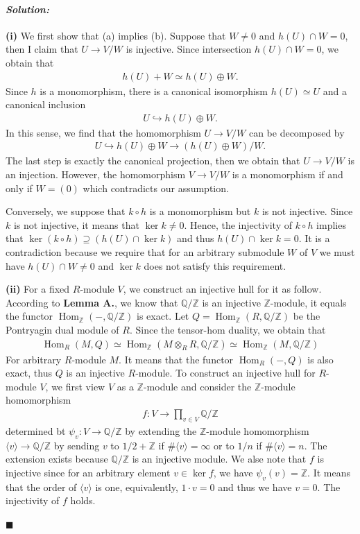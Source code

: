 \documentclass[12pt, a4paper]{article}
\newcommand{\qz}{\mathbb{Q}/\mathbb{Z}}
\newcommand{\z}{\mathbb{Z}}
\renewcommand{\hom}{\operatorname{Hom}}
\theoremstyle{remark}
\newenvironment{solution}
  {\paragraph{\textit{Solution:}}\par\medskip}
  {\hfill$\blacksquare$\vspace{0.1cm}}
\begin{document}
\begin{solution}
    \textbf{(i)}
    We first show that (a) implies (b). Suppose that $W\neq 0$ and $h(U)\cap W = 0$, then I claim that $U\to V/W$ is injective.
    Since intersection $h(U)\cap W = 0$, we obtain that
    \begin{align*}
        h(U)+W\simeq h(U)\oplus W.
    \end{align*}
    Since $h$ is a monomorphism, there is a canonical isomorphism $h(U)\simeq U$ and a canonical inclusion
    \begin{align*}
        U\hookrightarrow h(U)\oplus W.
    \end{align*}
    In this sense, we find that the homomorphism $U\to V/W$ can be decomposed by 
    \begin{align*}
        U \hookrightarrow h(U)\oplus W \to (h(U)\oplus W)/W.
    \end{align*}
    The last step is exactly the canonical projection, then we obtain that $U\to V/W$ is an injection.
    However, the homomorphism $V\to V/W$ is a monomorphism if and only if $W=(0)$ which contradicts our assumption.

    Conversely, we suppose that $k\circ h$ is a monomorphism but $k$ is not injective. 
    Since $k$ is not injective, it means that $\ker k\neq 0$. Hence, the injectivity of $k\circ h$ implies that $\ker (k\circ h)\supseteq (h(U)\cap \ker k)$ and thus
    $h(U)\cap \ker k=0$. It is a contradiction because we require that for an arbitrary submodule $W$ of $V$ we must have $h(U)\cap W \neq 0$ and $\ker k$ does not satisfy this requirement.

    \textbf{(ii)} For a fixed $R$-module $V$, we construct an injective hull for it as follow.
    According to \textbf{Lemma A.}, we know that $\qz$ is an injective $\z$-module, it equals the functor $\hom_{\z}(-,\qz)$ is exact.
    Let $Q=\hom_\z(R,\qz)$ be the Pontryagin dual module of $R$. Since the tensor-hom duality, we obtain that 
    \begin{align*}
        \hom_R(M,Q)\simeq \hom_\z(M\otimes_R R,\qz)\simeq \hom_\z(M,\qz)
    \end{align*}
    For arbitrary $R$-module $M$.
    It means that the functor $\hom_R(-,Q)$ is also exact, thus $Q$ is an injective $R$-module.
    To construct an injective hull for $R$-module $V$, we first view $V$ as a $\z$-module and consider the $\z$-module homomorphism
    \begin{align*}
        f:V \to \prod_{v\in V}\qz 
    \end{align*} 
    determined bt $\psi_v: V \to \qz$ by extending the $\z$-module homomorphism $\langle v \rangle\to \qz$ by sending $v$ to $1/2+\z$ if $\#\langle v\rangle=\infty$ or to $1/n$ if $\#\langle v\rangle=n$.
    The extension exists because $\qz$ is an injective module. We alse note that $f$ is injective since for an arbitrary element $v\in \ker f$, we have $\psi_v(v) = \z$. It means that the order of $\langle v \rangle$ is one,
    equivalently, $1\cdot v=0$ and thus we have $v=0$. The injectivity of $f$ holds.


\end{solution}
\end{document}
